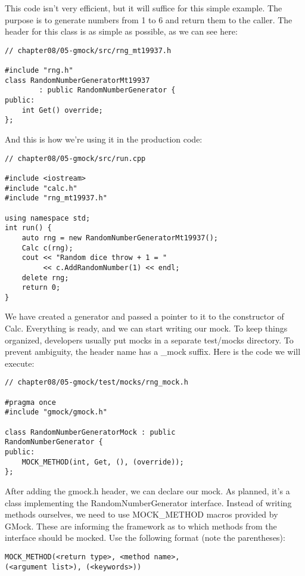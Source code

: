 This code isn't very efficient, but it will suffice for this simple example. The purpose is to generate numbers from 1 to 6 and return them to the caller. The header for this class is as simple as possible, as we can see here:

\begin{lstlisting}[style=styleCXX]
// chapter08/05-gmock/src/rng_mt19937.h

#include "rng.h"
class RandomNumberGeneratorMt19937
		: public RandomNumberGenerator {
public:
	int Get() override;
};
\end{lstlisting}

And this is how we're using it in the production code:

\begin{lstlisting}[style=styleCXX]
// chapter08/05-gmock/src/run.cpp

#include <iostream>
#include "calc.h"
#include "rng_mt19937.h"

using namespace std;
int run() {
	auto rng = new RandomNumberGeneratorMt19937();
	Calc c(rng);
	cout << "Random dice throw + 1 = "
		 << c.AddRandomNumber(1) << endl;
	delete rng;
	return 0;
}
\end{lstlisting}

We have created a generator and passed a pointer to it to the constructor of Calc. Everything is ready, and we can start writing our mock. To keep things organized, developers usually put mocks in a separate test/mocks directory. To prevent ambiguity, the header name has a \_mock suffix. Here is the code we will execute:

\begin{lstlisting}[style=styleCXX]
// chapter08/05-gmock/test/mocks/rng_mock.h

#pragma once
#include "gmock/gmock.h"

class RandomNumberGeneratorMock : public
RandomNumberGenerator {
public:
	MOCK_METHOD(int, Get, (), (override));
};
\end{lstlisting}

After adding the gmock.h header, we can declare our mock. As planned, it's a class implementing the RandomNumberGenerator interface. Instead of writing methods ourselves, we need to use MOCK\_METHOD macros provided by GMock. These are informing the framework as to which methods from the interface should be mocked. Use the following format (note the parentheses):

\begin{lstlisting}[style=styleCXX]
MOCK_METHOD(<return type>, <method name>,
(<argument list>), (<keywords>))
\end{lstlisting}


